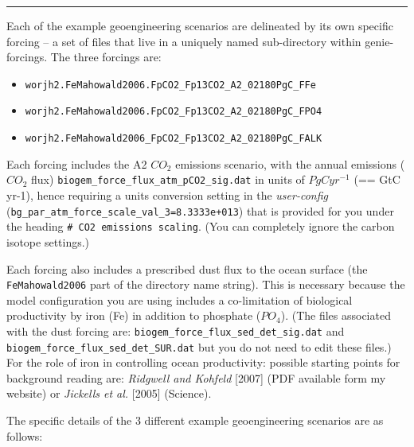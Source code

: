\documentclass[11pt,fleqn]{book} %
\begin{document}
\vspace{1mm}
\noindent\rule{4cm}{0.1mm}
\vspace{2mm}

\noindent Each of the example geoengineering scenarios are delineated by its own specific forcing – a set of files that live in a uniquely named sub-directory within genie-forcings. The three forcings are:

\vspace{2mm}
\begin{itemize}[noitemsep]
\item 
\begin{verbatim}worjh2.FeMahowald2006.FpCO2_Fp13CO2_A2_02180PgC_FFe\end{verbatim}
\item 
\begin{verbatim}worjh2.FeMahowald2006.FpCO2_Fp13CO2_A2_02180PgC_FPO4\end{verbatim}
\item 
\begin{verbatim}worjh2.FeMahowald2006_FpCO2_Fp13CO2_A2_02180PgC_FALK\end{verbatim}
\end{itemize}
\vspace{2mm}
   
Each forcing includes the A2 \(CO_{2}\) emissions scenario, with the annual emissions (\(CO_{2}\) flux) \texttt{biogem\_force\_flux\_atm\_pCO2\_sig.dat} in units of \(PgCyr^{-1}\) (== GtC yr-1), hence requiring a units conversion setting in the \textit{user-config} (\texttt{bg\_par\_atm\_force\_scale\_val\_3=8.3333e+013}) that is provided for you under the heading \texttt{\# CO2 emissions scaling}. (You can completely ignore the carbon isotope settings.)

Each forcing also includes a prescribed dust flux to the ocean surface (the \texttt{FeMahowald2006} part of the directory name string). This is necessary because the model configuration you are using includes a co-limitation of biological productivity by iron (Fe) in addition to phosphate (\(PO_{4}\)). (The files associated with the dust forcing are: \texttt{biogem\_force\_flux\_sed\_det\_sig.dat} and \texttt{biogem\_force\_flux\_sed\_det\_SUR.dat} but you do not need to edit these files.) For the role of iron in controlling ocean productivity: possible starting points for background reading are: \textit{Ridgwell and Kohfeld} [2007] (PDF available form my website) or \textit{Jickells et al.} [2005] (Science).

\vspace{1mm}
The specific details of the 3 different example geoengineering scenarios are as follows:
\end{document}
